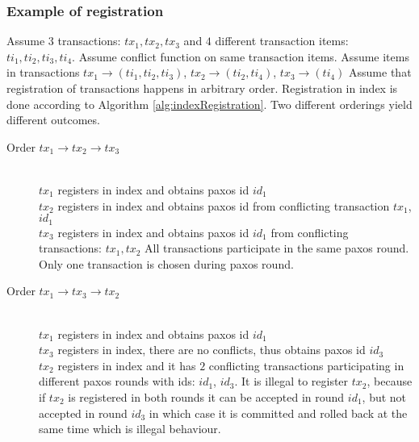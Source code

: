 \subsubsection{Example of registration}
Assume $3$ transactions: $tx_{1}, tx_{2}, tx_{3}$ and $4$ different transaction items: $ti_{1}, ti_{2}, ti_{3}, ti_{4}$. Assume conflict function on same transaction items.
Assume items in transactions $tx_{1} \rightarrow (ti_{1}, ti_{2}, ti_{3})$, 
 $tx_{2} \rightarrow (ti_{2}, ti_{4})$, $tx_{3} \rightarrow (ti_{4})$
Assume that registration of transactions happens in arbitrary order. Registration in index is done according to Algorithm \ref{alg:indexRegistration}. Two different orderings yield different outcomes. 
 \begin{description}
 \item[Order $tx_{1} \rightarrow tx_{2} \rightarrow tx_{3}$] \hfill \\
 	$tx_{1}$ registers in index and obtains paxos id $id_{1}$ \\
 	$tx_{2}$ registers in index and obtains paxos id from conflicting transaction $tx_{1}$, $id_{1}$ \\
 	$tx_{3}$ registers in index and obtains paxos id $id_{1}$ from conflicting transactions: $tx_{1}, tx_{2}$ All transactions participate in the same paxos round. Only one transaction is chosen during paxos round. 
 \item[Order $tx_{1} \rightarrow tx_{3} \rightarrow tx_{2}$] \hfill \\
 	$tx_{1}$ registers in index and obtains paxos id $id_{1}$ \\
 	$tx_{3}$ registers in index, there are no conflicts, thus obtains paxos id $id_{3}$\\
 	$tx_{2}$ registers in index and it has $2$ conflicting transactions participating in different paxos rounds with ids: $id_{1}$, $id_{3}$. It is illegal to register $tx_{2}$, because if $tx_{2}$ is registered in both rounds it can be accepted in round $id_{1}$, but not accepted in round $id_{3}$ in which case it is committed and rolled back at the same time which is illegal behaviour. 

 \end{description}



